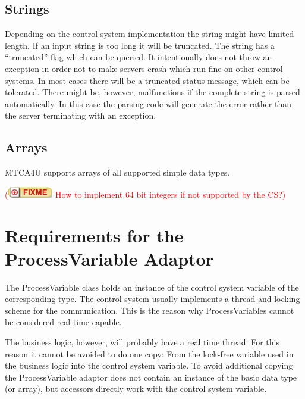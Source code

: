 \documentclass[11pt,a4paper]{scrartcl}
\newcounter{nFixmes}
\newcommand{\fixme}[1]{\addtocounter{nFixmes}{1}\textcolor{red}{(\includegraphics[height=2ex]{fixme} #1)}\xspace}
\begin{document}
\subsection{Strings}

Depending on the control system implementation the string might have limited length. If an input string is too long it will be truncated. The string has a “truncated” flag which can be queried. It intentionally does not throw an exception in order not to make servers crash which run fine on other control systems. In most cases there will be a truncated status message, which can be tolerated. There might be, however, malfunctions if the complete string is parsed automatically. In this case the parsing code will generate the error rather than the server terminating with an exception.

\subsection{Arrays}

MTCA4U supports arrays of all supported simple data types. \fixme{How to implement 64 bit integers if not supported by the CS?}

\section{Requirements for the ProcessVariable Adaptor}\label{section_process_variable_adapter}

The ProcessVariable class holds an instance of the control system variable of the corresponding type. The control system usually implements a thread and locking scheme for the communication. This is the reason why ProcessVariables cannot be considered real time capable.

The business logic, however, will probably have a real time thread. For this reason it cannot be avoided to do one copy: From the lock-free variable used in the business logic into the control system variable. To avoid additional copying the ProcessVariable adaptor does not contain an instance of the basic data type (or array), but accessors directly work with the control system variable.
\end{document}
